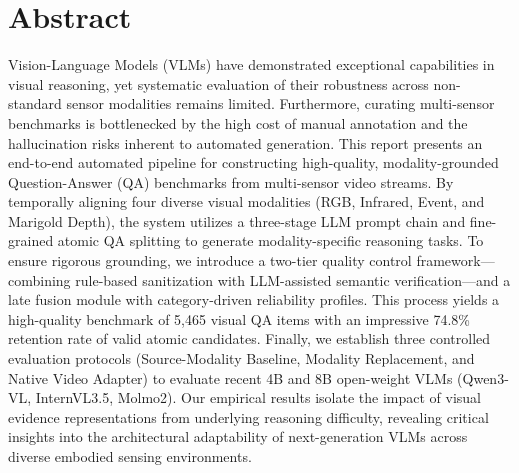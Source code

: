 \chapter*{Abstract}

Vision-Language Models (VLMs) have demonstrated exceptional capabilities in
visual reasoning, yet systematic evaluation of their robustness across
non-standard sensor modalities remains limited. Furthermore, curating
multi-sensor benchmarks is bottlenecked by the high cost of manual annotation
and the hallucination risks inherent to automated generation. This report
presents an end-to-end automated pipeline for constructing high-quality,
modality-grounded Question-Answer (QA) benchmarks from multi-sensor video
streams. By temporally aligning four diverse visual modalities (RGB, Infrared,
Event, and Marigold Depth), the system utilizes a three-stage LLM prompt chain
and fine-grained atomic QA splitting to generate modality-specific reasoning
tasks. To ensure rigorous grounding, we introduce a two-tier quality control
framework—combining rule-based sanitization with LLM-assisted semantic
verification—and a late fusion module with category-driven reliability profiles.
This process yields a high-quality benchmark of 5,465 visual QA items with an
impressive 74.8\% retention rate of valid atomic candidates. Finally, we
establish three controlled evaluation protocols (Source-Modality Baseline,
Modality Replacement, and Native Video Adapter) to evaluate recent 4B and 8B
open-weight VLMs (Qwen3-VL, InternVL3.5, Molmo2). Our empirical results isolate
the impact of visual evidence representations from underlying reasoning
difficulty, revealing critical insights into the architectural adaptability of
next-generation VLMs across diverse embodied sensing environments.
